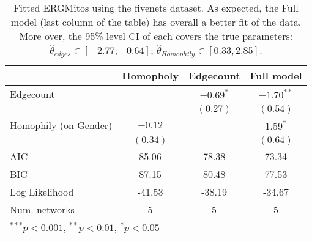 
\begin{table}
\begin{center}
\begin{tabular}{l c c c }
\hline
 & Homopholy & Edgecount & Full model \\
\hline
Edgecount             &          & $-0.69^{*}$ & $-1.70^{**}$ \\
                      &          & $(0.27)$    & $(0.54)$     \\
Homophily (on Gender) & $-0.12$  &             & $1.59^{*}$   \\
                      & $(0.34)$ &             & $(0.64)$     \\
\hline
AIC                   & 85.06    & 78.38       & 73.34        \\
BIC                   & 87.15    & 80.48       & 77.53        \\
Log Likelihood        & -41.53   & -38.19      & -34.67       \\
Num. networks         & 5        & 5           & 5            \\
\hline
\multicolumn{4}{l}{\scriptsize{$^{***}p<0.001$, $^{**}p<0.01$, $^*p<0.05$}}
\end{tabular}
\caption{Fitted ERGMitos using the fivenets dataset. As expected, the Full model (last column of the table) has overall a better fit of the data. More over, the 95\% level CI of each covers the true parameters: $\hat\theta_{edges} \in [-2.77, -0.64]$; $\hat\theta_{Homophily} \in [0.33, 2.85]$.}
\label{table:coefficients}
\end{center}
\end{table}
